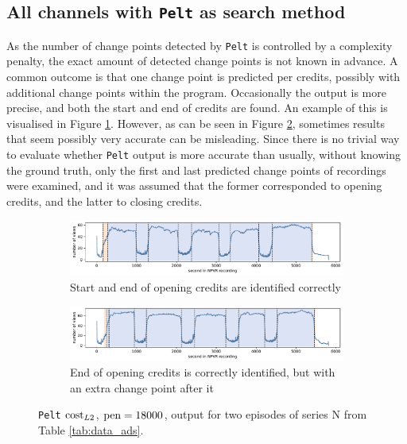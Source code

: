\subsection{All channels with \texttt{Pelt} as search method} \label{sec:results_pelt}

As the number of change points detected by \texttt{Pelt} is controlled by a complexity penalty, the exact amount of detected change points is not known in advance. A common outcome is that one change point is predicted per credits, possibly with additional change points within the program. Occasionally the output is more precise, and both the start and end of credits are found. An example of this is visualised in Figure \ref{fig:intro_good}. However, as can be seen in Figure \ref{fig:intro_bad}, sometimes results that seem possibly very accurate can be misleading. Since there is no trivial way to evaluate whether \texttt{Pelt} output is more accurate than usually, without knowing the ground truth, only the first and last predicted change points of recordings were examined, and it was assumed that the former corresponded to opening credits, and the latter to closing credits.

\begin{figure}[h]
  \centering
  \begin{subfigure}[b]{\textwidth}
     \includegraphics[width=1\textwidth]{../plots/intro_good.pdf}
     \caption{Start and end of opening credits are identified correctly}
     \label{fig:intro_good} 
  \end{subfigure}
  \par\bigskip
  \begin{subfigure}[b]{\textwidth}
     \includegraphics[width=1\textwidth]{../plots/intro_bad.pdf}
     \caption{End of opening credits is correctly identified, but with an extra change point after it}
     \label{fig:intro_bad}
  \end{subfigure}
  \caption{\texttt{Pelt} $\operatorname{cost}_{L2}$, $\operatorname{pen}=18000$, output for two episodes of series N from Table \ref{tab:data_ads}.}
  \label{fig:intro_pelt}
\end{figure}

